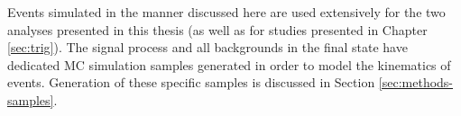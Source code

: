 Events simulated in the manner discussed here are used extensively for the two
analyses presented in this thesis (as well as for studies presented in Chapter
\ref{sec:trig}). The signal process and all backgrounds in the final state have
dedicated \ac{MC} simulation samples generated in order to model the kinematics
of events. Generation of these specific samples is discussed in Section
\ref{sec:methods-samples}.
